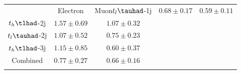 \centering
\begin{tabular}{|c|c|c|} \toprule\toprule
 & Electron & Muon$t_{l}\tauhad$-1j & $0.68\pm0.17$ & $0.59\pm0.11$\\
$t_{h}\tlhad$-2j & $1.57\pm0.69$ & $1.07\pm0.32$\\
$t_{l}\tauhad$-2j & $1.07\pm0.52$ & $0.75\pm0.23$\\
$t_{h}\tlhad$-3j & $1.15\pm0.85$ & $0.60\pm0.37$\\
Combined & $0.77\pm0.27$ & $0.66\pm0.16$\\
\bottomrule\bottomrule\\
\end{tabular}
